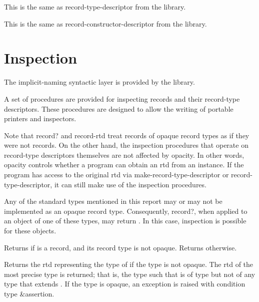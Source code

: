 \begin{entry}{%
}

This is the same as {\cf record-type-descriptor} from the
 library.
\end{entry}

\begin{entry}{%
}
   
This is the same as {\cf record-constructor-descriptor} from the
 library.
\end{entry}

\section{Inspection}

The implicit-naming syntactic layer is provided by the
 library.

A set of procedures are provided for inspecting records and their
record-type descriptors. These procedures are designed to allow the
writing of portable printers and inspectors.

Note that {\cf record?} and {\cf record-rtd} treat records of opaque
record types as if they were not records. On the other hand, the
inspection procedures that operate on record-type descriptors
themselves are not affected by opacity. In other words, opacity
controls whether a program can obtain an rtd from an instance. If the
program has access to the original rtd via {\cf
  make-record-type-descriptor} or {\cf record-type-descriptor}, it can
still make use of the inspection procedures.

Any of the standard types mentioned in this report may or may not be
implemented as an opaque record type.  Consequently, {\cf record?},
when applied to an object of one of these types, may return
\schtrue{}.  In this case, inspection is possible for these objects.

\begin{entry}{%
}
   
Returns \schtrue{} if  is a record, and its record type is
not opaque. Returns \schfalse{} otherwise.  
\end{entry}

\begin{entry}{%
}
   
Returns the rtd representing the type of  if the type is not
opaque. The rtd of the most precise type is returned; that is, the
type  such that  is of type  but not of any
type that extends .  If the type is opaque, an exception is
raised with condition type {\cf\&assertion}.
\end{entry}

